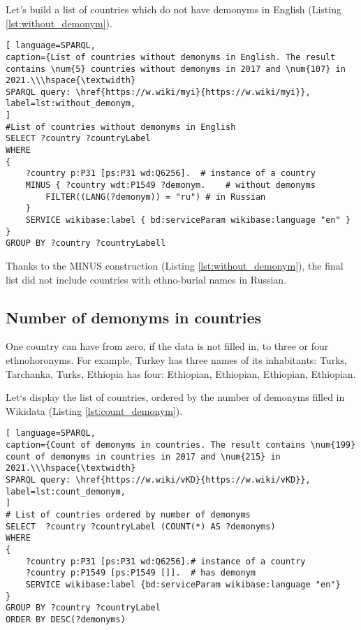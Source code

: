 Let's build a list of countries which do not have demonyms in English (Listing \ref{lst:without_demonym}).

\begin{lstlisting}[ language=SPARQL, 
caption={List of countries without demonyms in English. The result contains \num{5} countries without demonyms in 2017 and \num{107} in 2021.\\\hspace{\textwidth}
SPARQL query: \href{https://w.wiki/myi}{https://w.wiki/myi}},
label=lst:without_demonym, 
]
#List of countries without demonyms in English
SELECT ?country ?countryLabel 
WHERE
{
	?country p:P31 [ps:P31 wd:Q6256].  # instance of a country
	MINUS { ?country wdt:P1549 ?demonym.    # without demonyms
		FILTER((LANG(?demonym)) = "ru") # in Russian
	}
	SERVICE wikibase:label { bd:serviceParam wikibase:language "en" }
}
GROUP BY ?country ?countryLabell
\end{lstlisting}

Thanks to the MINUS construction (Listing \ref{lst:without_demonym}), the final list did not include countries with ethno-burial names in Russian.

\subsection{Number of demonyms in countries}

One country can have from zero, if the data is not filled in, to three or four ethnohoronyms. For example, Turkey has three names of its inhabitants: Turks, Tarchanka, Turks, Ethiopia has four: Ethiopian, Ethiopian, Ethiopian, Ethiopian.

Let`s display the list of countries, ordered by the number of demonyms filled in Wikidata (Listing \ref{lst:count_demonym}).

\begin{lstlisting}[ language=SPARQL, 
caption={Count of demonyms in countries. The result contains \num{199} count of demonyms in countries in 2017 and \num{215} in 2021.\\\hspace{\textwidth}
SPARQL query: \href{https://w.wiki/vKD}{https://w.wiki/vKD}},
label=lst:count_demonym, 
]
# List of countries ordered by number of demonyms
SELECT  ?country ?countryLabel (COUNT(*) AS ?demonyms)
WHERE
{
	?country p:P31 [ps:P31 wd:Q6256].# instance of a country
	?country p:P1549 [ps:P1549 []].  # has demonym
	SERVICE wikibase:label {bd:serviceParam wikibase:language "en"}
}
GROUP BY ?country ?countryLabel 
ORDER BY DESC(?demonyms)
\end{lstlisting}

